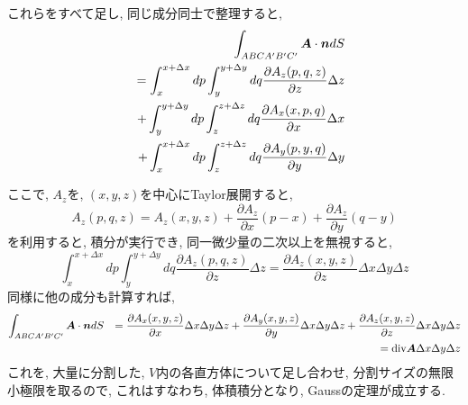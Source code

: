 \documentclass{jsarticle}
\newcommand*{\mbold}[1]{\mbox{\boldmath $#1$}}
\newcommand*{\divg}{{\rm div}}
\begin{document}
これらをすべて足し, 同じ成分同士で整理すると, 
\begin{eqnarray}
  && \int_{ABCA^\prime B^\prime C^\prime} \mbold{A}\cdot \mbold{n}dS \nonumber \\
  && = \int_x^{x + \Delta x}dp \int_y^{y + \Delta y}dq \frac{\partial A_z(p, q, z)}{\partial z}\Delta z \nonumber \\
  && + \int_y^{y + \Delta y}dp \int_z^{z + \Delta z}dq \frac{\partial A_x(x, p, q)}{\partial x}\Delta x \nonumber \\
  && + \int_x^{x + \Delta x}dp \int_z^{z + \Delta z}dq \frac{\partial A_y(p, y, q)}{\partial y}\Delta y 
\end{eqnarray}

ここで, $A_z$を, $(x, y, z)$を中心にTaylor展開すると, 
\begin{equation}
  A_z(p, q, z) = A_z(x, y, z) + \frac{\partial A_z}{\partial x}(p - x) + \frac{\partial A_z}{\partial y}(q - y)
\end{equation}
を利用すると, 積分が実行でき, 同一微少量の二次以上を無視すると, 
\begin{equation}
  \int_x^{x + \Delta x}dp \int_y^{y + \Delta y}dq \frac{\partial A_z(p, q, z)}{\partial z}\Delta z
  = \frac{\partial A_z(x, y, z)}{\partial z}\Delta x \Delta y \Delta z
\end{equation}
同様に他の成分も計算すれば, 
\begin{eqnarray}
  \int_{ABCA^\prime B^\prime C^\prime} \mbold{A}\cdot \mbold{n}dS
  && = \frac{\partial A_x(x, y, z)}{\partial x}\Delta x \Delta y \Delta z
  + \frac{\partial A_y(x, y, z)}{\partial y}\Delta x \Delta y \Delta z
  + \frac{\partial A_z(x, y, z)}{\partial z}\Delta x \Delta y \Delta z \nonumber\\
  && = \divg\mbold{A} \Delta x \Delta y \Delta z
\end{eqnarray}
これを, 大量に分割した, $V$内の各直方体について足し合わせ, 分割サイズの無限小極限を取るので, 
これはすなわち, 体積積分となり, Gaussの定理が成立する. 
\end{document}
